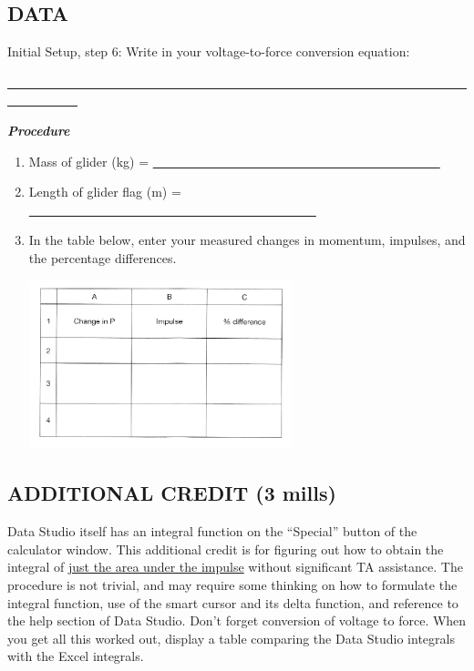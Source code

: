 \subsection*{DATA}

Initial Setup, step 6: Write in your voltage-to-force conversion equation:

\ul{~~~~~~~~~~~~~~~~~~~~~~~~~~~~~~~~~~~~~~~~~~~~~~~~~~~~~~~~~~~~~~~~~~~~~~~~~~~~~~~~~~~}

\textbf{\textit{Procedure}}

\begin{enumerate}[start=2]

\item Mass of glider (kg) = \ul{~~~~~~~~~~~~~~~~~~~~~~~~~~~~~~~~~~~~~~~~~~~~~}

\item Length of glider flag (m) = \ul{~~~~~~~~~~~~~~~~~~~~~~~~~~~~~~~~~~~~~~~~~~~~~}

\setcounter{enumi}{11}
\item In the table below, enter your measured changes in momentum, impulses, and the percentage differences.
\begin{center} \includegraphics*[width=0.6\textwidth]{imgs/6labs/6Alab/6Aexp5/M_Itable_sm.png} \end{center}

\end{enumerate}

\subsection*{ADDITIONAL CREDIT (3 mills)}

Data Studio itself has an integral function on the ``Special'' button of the calculator window.  This additional credit is for figuring out how to obtain the integral of \ul{just the area under the impulse} without significant TA assistance.  The procedure is not trivial, and may require some thinking on how to formulate the integral function, use of the smart cursor and its delta function, and reference to the help section of Data Studio.  Don't forget conversion of voltage to force.   When you get all this worked out, display a table comparing the Data Studio integrals with the Excel integrals.
